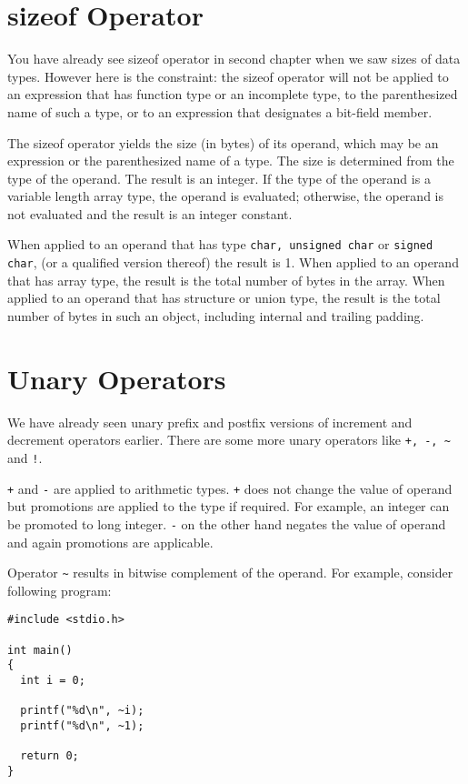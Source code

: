 \section{sizeof Operator}
You have already see sizeof operator in second chapter when we saw sizes of
data types. However here is the constraint: the sizeof operator will not be
applied to an expression that has function type or an incomplete type, to the
parenthesized name of such a type, or to an expression that designates a
bit-field member.

The sizeof operator yields the size (in bytes) of its operand, which may be an
expression or the parenthesized name of a type. The size is determined from the
type of the operand. The result is an integer. If the type of the operand is a
variable length array type, the operand is evaluated; otherwise, the operand is
not evaluated and the result is an integer constant.

When applied to an operand that has type \texttt{char, unsigned char} or
\texttt{signed char}, (or a qualified version thereof) the result is 1. When
applied to an operand that has array type, the result is the total number of
bytes in the array. When applied to an operand that has structure or union
type, the result is the total number of bytes in such an object, including
internal and trailing padding.

\section{Unary Operators}
 We have already seen unary prefix and postfix versions of increment and
 decrement operators earlier. There are some more unary operators like
 \texttt{+, -, \~{}} and \texttt{!}.

\texttt{+} and \texttt{-} are applied to arithmetic types. \texttt{+} does not
change the value of operand but promotions are applied to the type if
required. For example, an integer can be promoted to long integer. \texttt{-}
on the other hand negates the value of operand and again promotions are
applicable.

Operator \texttt{\~{}} results in bitwise complement of the operand. For
example, consider following program:

\begin{verbatim}
#include <stdio.h>

int main()
{
  int i = 0;

  printf("%d\n", ~i);
  printf("%d\n", ~1);

  return 0;
}
\end{verbatim}

